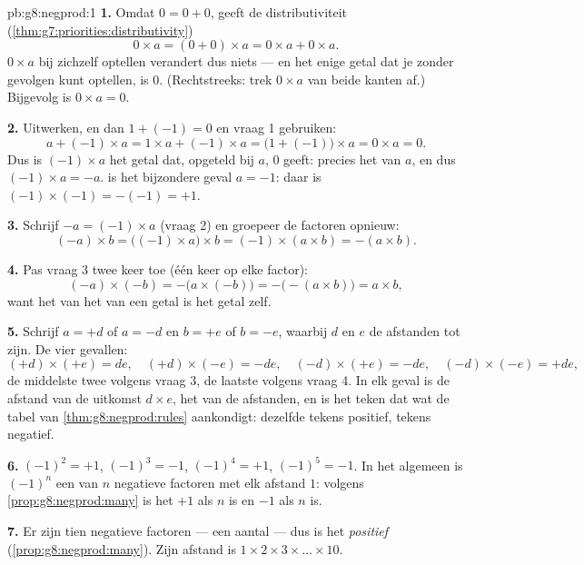\begin{solution}{pb:g8:negprod:1}
\textbf{1.} Omdat $0 = 0 + 0$, geeft de distributiviteit
(\cref{thm:g7:priorities:distributivity})
\[
0 \times a = (0 + 0) \times a = 0 \times a + 0 \times a .
\]
$0 \times a$ bij zichzelf optellen verandert dus niets --- en het enige getal dat je
zonder gevolgen kunt optellen, is $0$. (Rechtstreeks: trek $0 \times a$ van beide
kanten af.) Bijgevolg is $0 \times a = 0$.

\textbf{2.} Uitwerken, en dan $1 + (-1) = 0$ en vraag 1 gebruiken:
\[
a + (-1) \times a
= 1 \times a + (-1) \times a
= \bigl(1 + (-1)\bigr) \times a
= 0 \times a = 0 .
\]
Dus is $(-1) \times a$ het getal dat, opgeteld bij $a$, $0$ geeft: precies het
 van $a$, en dus $(-1) \times a = -a$.
 is het bijzondere geval $a = -1$: daar is
$(-1) \times (-1) = -(-1) = +1$.

\textbf{3.} Schrijf $-a = (-1) \times a$ (vraag 2) en groepeer de factoren opnieuw:
\[
(-a) \times b
= \bigl((-1) \times a\bigr) \times b
= (-1) \times (a \times b)
= -(a \times b) .
\]

\textbf{4.} Pas vraag 3 twee keer toe (één keer op elke factor):
\[
(-a) \times (-b)
= -\bigl(a \times (-b)\bigr)
= -\bigl(-(a \times b)\bigr)
= a \times b ,
\]
want het  van het  van een getal is het getal zelf.

\textbf{5.} Schrijf $a = +d$ of $a = -d$ en $b = +e$ of $b = -e$, waarbij $d$ en $e$ de
afstanden tot  zijn. De vier gevallen:
\[
(+d) \times (+e) = de, \quad
(+d) \times (-e) = -de, \quad
(-d) \times (+e) = -de, \quad
(-d) \times (-e) = +de,
\]
de middelste twee volgens vraag 3, de laatste volgens vraag 4. In elk geval is de
afstand van de uitkomst $d \times e$, het  van de afstanden, en is het teken dat
wat de tabel van \cref{thm:g8:negprod:rules} aankondigt: dezelfde tekens positief,
 tekens negatief.

\textbf{6.} $(-1)^2 = +1$, $(-1)^3 = -1$, $(-1)^4 = +1$, $(-1)^5 = -1$. In het algemeen
is $(-1)^n$ een  van $n$ negatieve factoren met elk afstand $1$: volgens
\cref{prop:g8:negprod:many} is het $+1$ als $n$  is en $-1$ als $n$  is.

\textbf{7.} Er zijn tien negatieve factoren --- een  aantal --- dus is het 
\emph{positief} (\cref{prop:g8:negprod:many}). Zijn afstand is
$1 \times 2 \times 3 \times \dots \times 10$.


\end{solution}
